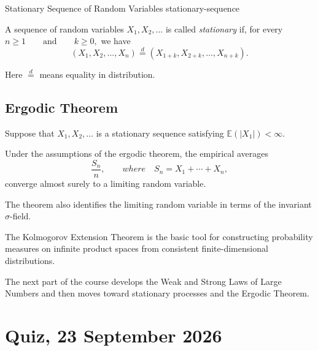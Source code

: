 \begin{definition}{Stationary Sequence of Random Variables}
{stationary-sequence}

A sequence of random variables
\(
X_1,X_2,\ldots
\)
is called \emph{stationary} if, for every
\(
n\geq1
\qquad\text{and}\qquad
k\geq0,
\)
we have
\[
(X_1,X_2,\ldots,X_n)
\overset{d}{=}
(X_{1+k},X_{2+k},\ldots,X_{n+k}).
\]

Here
\(
\overset{d}{=}
\)
means equality in distribution.

\end{definition}


\subsection{Ergodic Theorem}

\begin{observation}

Suppose that
\(
X_1,X_2,\ldots
\)
is a stationary sequence satisfying
\(
\mathbb{E}(|X_1|)<\infty.
\)

Under the assumptions of the ergodic theorem, the empirical averages
\[
\frac{S_n}{n},
\qquad where \quad S_n=X_1+\cdots+X_n,
\]
converge almost surely to a limiting random variable.

The theorem also identifies the limiting random variable in terms of
the invariant $\sigma$-field.

\end{observation}



\begin{profnote}

The Kolmogorov Extension Theorem is the basic tool for constructing
probability measures on infinite product spaces from consistent
finite-dimensional distributions.

The next part of the course develops the Weak and Strong Laws of
Large Numbers and then moves toward stationary processes and the
Ergodic Theorem.

\end{profnote}



\lectureend

\section{Quiz, 23 September 2026}




